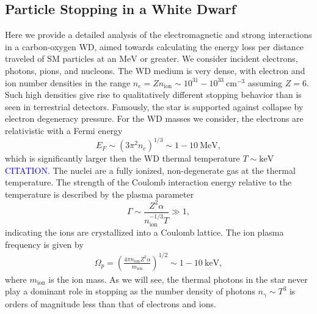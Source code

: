 \documentclass[preprintnumbers,amsmath,amssymb,prd, superscriptaddress,twocolumn]{revtex4}
\newcommand{\MeV}{\text{MeV}}
\newcommand{\keV}{\text{keV}}
\newcommand{\cm}{\text{cm}}
\def\r{\right)}
\def\l{\left(}
\begin{document}
\begin{appendices}

\section{Particle Stopping in a White Dwarf}
\label{sec:Appendix}
Here we provide a detailed analysis of the electromagnetic and strong interactions in a carbon-oxygen WD, aimed towards calculating the energy loss per distance traveled of SM particles at an $\text{MeV}$ or greater.
We consider incident electrons, photons, pions, and nucleons.
The WD medium is very dense, with electron and ion number densities in the range $n_e = Z n_\text{ion} \sim 10^{31} - 10^{33} ~\cm^{-3}$ assuming $Z=6$.
Such high densities give rise to qualitatively different stopping behavior than is seen in terrestrial detectors.
Famously, the star is supported against collapse by electron degeneracy pressure.
For the WD masses we consider, the electrons are relativistic with a Fermi energy
\begin{equation}
  E_F \sim (3 \pi^2 n_e)^{1/3} \sim 1 -10 ~\MeV,
\end{equation}
which is significantly larger then the WD thermal temperature $T \sim \keV$ \textcolor{blue}{CITATION}.
The nuclei are a fully ionized, non-degenerate gas at the thermal temperature.
The strength of the Coulomb interaction energy relative to the temperature is described by the plasma parameter
\begin{equation}
\label{eq:lattice}
 \Gamma \sim \frac{Z^2 \alpha}{n_\text{ion}^{-1/3}T} \gg 1,
\end{equation}
indicating the ions are crystallized into a Coulomb lattice.
The ion plasma frequency is given by
\begin{align}
\Omega_p = \l \frac{4 \pi n_\text{ion} Z^2 \alpha}{m_\text{ion}}\r^{1/2} \sim 1 - 10~\text{keV},
\end{align}
where $m_\text{ion}$ is the ion mass.
As we will see, the thermal photons in the star never play a dominant role in stopping as the number density of photons $n_\gamma \sim T^3$ is orders of magnitude less than that of electrons and ions.




\end{appendices}
\end{document}
